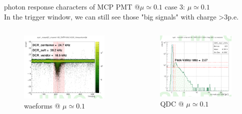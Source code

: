 \documentclass[11pt,compress,xcolor=x11names,UTF8]{beamer}
\begin{document}
\begin{frame}{photon response characters of MCP PMT @$\mu\simeq 0.1$ }
	case 3: $\mu\simeq 0.1$\\
	In the trigger window, we can still see those "big signals" with charge >3p.e.
\begin{columns}
\begin{column}{.495\textwidth}
\begin{figure}
\centering
\includegraphics[width=0.94\textwidth]{figure/p1pewave.png} %
\caption{waeforms @ $\mu\simeq  0.1$}
\end{figure}
\end{column}
\begin{column}{.475\textwidth}
\begin{figure}
\centering
\includegraphics[width=0.94\textwidth]{figure/p1peqdc.png} %
\caption{QDC @ $\mu\simeq  0.1$}
\end{figure}
\end{column}
\end{columns}
\end{frame}
\end{document}

